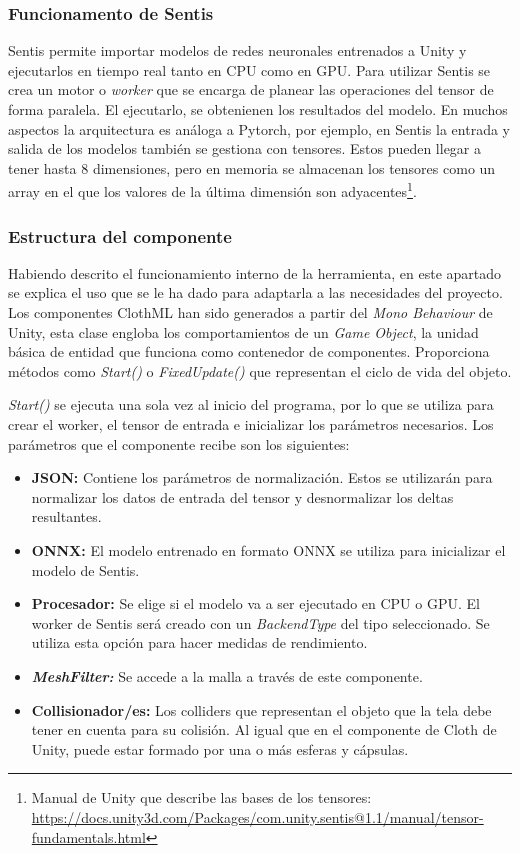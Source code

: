 \subsubsection{Funcionamento de Sentis}
Sentis permite importar modelos de redes neuronales entrenados a Unity y ejecutarlos en tiempo real tanto en CPU como en GPU. Para utilizar Sentis se crea un motor o \textit{worker} que se encarga de planear las operaciones del tensor de forma paralela. El ejecutarlo, se obtenienen los resultados del modelo. En muchos aspectos la arquitectura es análoga a Pytorch, por ejemplo, en Sentis la entrada y salida de los modelos también se gestiona con tensores. Estos pueden llegar a tener hasta 8 dimensiones, pero en memoria se almacenan los tensores como un array en el que los valores de la última dimensión son adyacentes\footnote{Manual de Unity que describe las bases de los tensores: \url{https://docs.unity3d.com/Packages/com.unity.sentis@1.1/manual/tensor-fundamentals.html}}. 

\subsubsection{Estructura del componente}
Habiendo descrito el funcionamiento interno de la herramienta, en este apartado se explica el uso que se le ha dado para adaptarla a las necesidades del proyecto. Los componentes ClothML han sido generados a partir del \textit{Mono Behaviour} de Unity, esta clase engloba los comportamientos de un \textit{Game Object}, la unidad básica de entidad que funciona como contenedor de componentes. Proporciona métodos como \textit{Start()} o \textit{FixedUpdate()} que representan el ciclo de vida del objeto.\newline

\textit{Start()} se ejecuta una sola vez al inicio del programa, por lo que se utiliza para crear el worker, el tensor de entrada e inicializar los parámetros necesarios. Los parámetros que el componente recibe son los siguientes:
\begin{itemize}
    \item \textbf{JSON:} Contiene los parámetros de normalización. Estos se utilizarán para normalizar los datos de entrada del tensor y desnormalizar los deltas resultantes.
    \item \textbf{ONNX:} El modelo entrenado en formato ONNX se utiliza para inicializar el modelo de Sentis.
    \item \textbf{Procesador:} Se elige si el modelo va a ser ejecutado en CPU o GPU. El worker de Sentis será creado con un \textit{BackendType} del tipo seleccionado. Se utiliza esta opción para hacer medidas de rendimiento.
    \item \textbf{\textit{MeshFilter:}} Se accede a la malla a través de este componente.
    \item \textbf{Collisionador/es:} Los colliders que representan el objeto que la tela debe tener en cuenta para su colisión. Al igual que en el componente de Cloth de Unity, puede estar formado por una o más esferas y cápsulas.
\end{itemize}

